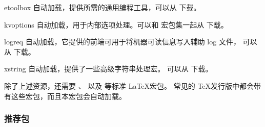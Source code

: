 \begin{marglist}
\item[etoolbox] 
自动加载，提供\biblatex 所需的通用编程工具，可以从  下载。

\item[kvoptions] 
自动加载，用于内部选项处理。可以和  宏包集一起从  下载。

\item[logreq]
自动加载，它提供的前端可用于将机器可读信息写入辅助 log 文件，
可以从  下载。

\item[xstring]
自动加载，提供了一些高级字符串处理宏。
可以从  下载。

\end{marglist}


除了上述资源，\biblatex 还需要 、 以及  等标准 \LaTeX 宏包。
常见的 \TeX 发行版中都会带有这些宏包，而且本宏包会自动加载。

\subsubsection{推荐包}
\label{int:pre:rec}



